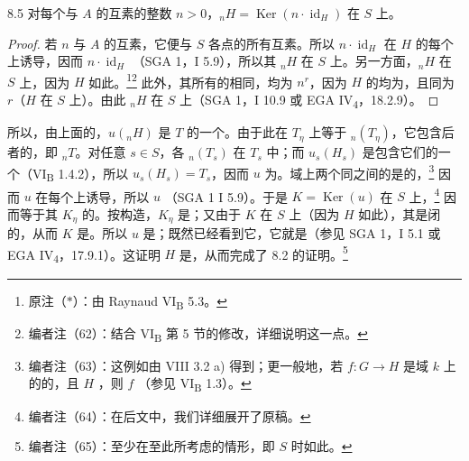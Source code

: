 \begin{SGAresult}{}{8.5}
对每个与 $A$ 的互素的整数 $n>0$，${}_nH=\operatorname{Ker}(n\cdot\operatorname{id}_H)$ 在 $S$ 上。
\end{SGAresult}
\begin{proof}
若 $n$ 与 $A$ 的互素，它便与 $S$ 各点的所有互素。所以 $n\cdot\operatorname{id}_H$ 在 $H$ 的每个上诱导，因而 $n\cdot\operatorname{id}_H$ （SGA 1，I 5.9），所以其 ${}_nH$ 在 $S$ 上。另一方面，${}_nH$ 在 $S$ 上，因为 $H$ 如此。\footnote{原注（$*$）：由 Raynaud  VI\textsubscript{B} 5.3。}\footnote{编者注（62）：结合 VI\textsubscript{B} 第 5 节的修改，详细说明这一点。} 此外，其所有的相同，均为 $n^r$，因为 $H$ 的均为，且同为 $r$（$H$ 在 $S$ 上）。由此 ${}_nH$ 在 $S$ 上（SGA 1，I 10.9 或 EGA IV\textsubscript{4}，18.2.9）。
\end{proof}
所以，由上面的，$u({}_nH)$ 是 $T$ 的一个。由于此在 $T_\eta$ 上等于 ${}_n(T_\eta)$，它包含后者的，即 ${}_nT$。对任意 $s\in S$，各 ${}_n(T_s)$ 在 $T_s$ 中；而 $u_s(H_s)$ 是包含它们的一个（VI\textsubscript{B} 1.4.2），所以 $u_s(H_s)=T_s$，因而 $u$ 为。域上两个同之间的是的，\footnote{编者注（63）：这例如由 VIII 3.2 a) 得到；更一般地，若 $f:G\to H$ 是域 $k$ 上的的，且 $H$ ，则 $f$ （参见 VI\textsubscript{B} 1.3）。} 因而 $u$ 在每个上诱导，所以 $u$ （SGA 1 I 5.9）。于是 $K=\operatorname{Ker}(u)$ 在 $S$ 上，\footnote{编者注（64）：在后文中，我们详细展开了原稿。} 因而等于其 $K_\eta$ 的。按构造，$K_\eta$ 是；又由于 $K$ 在 $S$ 上（因为 $H$ 如此），其是闭的，从而 $K$ 是。所以 $u$ 是；既然已经看到它，它就是（参见 SGA 1，I 5.1 或 EGA IV\textsubscript{4}，17.9.1）。这证明 $H$ 是，从而完成了 8.2 的证明。\footnote{编者注（65）：至少在至此所考虑的情形，即 $S$ 时如此。}

